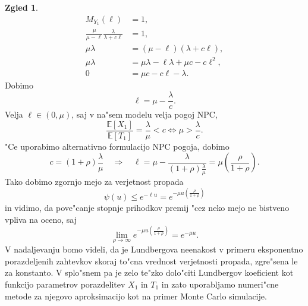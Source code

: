 \documentclass[12pt, a4paper, reqno]{amsart}
\theoremstyle{definition}
\newtheorem{zgled}[definicija]{Zgled}
\theoremstyle{plain}
\newcommand{\E}{\mathbb{E}}
\newcommand{\1}{\mathds{1}}
\begin{document}
\begin{zgled}
                \begin{align*}
                    M_{Y_1}(\ell) &= 1, \\
                    \frac{\mu}{\mu - \ell}\frac{\lambda}{\lambda + c\ell} &= 1, \\
                    \mu\lambda &= (\mu - \ell)(\lambda + c\ell), \\
                    \mu\lambda &= \mu\lambda - \ell\lambda + \mu c - c\ell^2, \\
                    0 &= \mu c - c\ell - \lambda.
                \end{align*}
                Dobimo 
                \begin{equation}
                    \ell = \mu - \frac{\lambda}{c}.
                    \label{eq:LundbergovKoeficientExpPrva}
                \end{equation}
                Velja $\ell \in (0, \mu)$, saj v na"sem modelu velja pogoj NPC,
                \begin{equation*}
                    \frac{\E\left[X_1\right]}{\E\left[T_1\right]} = \frac{\lambda}{\mu} < c \iff \mu > \frac{\lambda}{c}.
                \end{equation*}
                "Ce uporabimo alternativno formulacijo NPC pogoja, dobimo
                \begin{equation}
                    c = (1 + \rho)\frac{\lambda}{\mu} \quad \Rightarrow \quad
                    \ell = \mu - \frac{\lambda}{(1 + \rho)\frac{\lambda}{\mu}} = \mu\left(\frac{\rho}{1 + \rho}\right).
                    \label{eq:LundbergovKoeficientExp}
                \end{equation}
                Tako dobimo zgornjo mejo za verjetnost propada
                \begin{equation*}
                    \psi(u) \leq e^{-\ell u} = e^{-\mu u\left(\frac{\rho}{1 + \rho}\right)}
                \end{equation*}
                in vidimo, da pove"canje stopnje prihodkov premij "cez neko mejo ne bistveno 
                vpliva na oceno, saj 
                \begin{equation*}
                    \lim_{\rho\to\infty}e^{-\mu u\left(\frac{\rho}{1 + \rho}\right)} = e^{-\mu u}.
                \end{equation*}
                V nadaljevanju bomo videli, da je Lundbergova neenakost v primeru eksponentno 
                porazdeljenih zahtevkov skoraj to"cna vrednost verjetnosti propada, zgre"sena le za konstanto.
                V splo"snem pa je zelo te"zko dolo"citi Lundbergov koeficient kot funkcijo parametrov
                porazdelitev $X_1$ in $T_1$ in zato uporabljamo numeri"cne metode za njegovo aproksimacijo 
                kot na primer Monte Carlo simulacije. 
                \label{zgd:LundebrgovaNeenakostEksponentno}
            \end{zgled}
\end{document}
